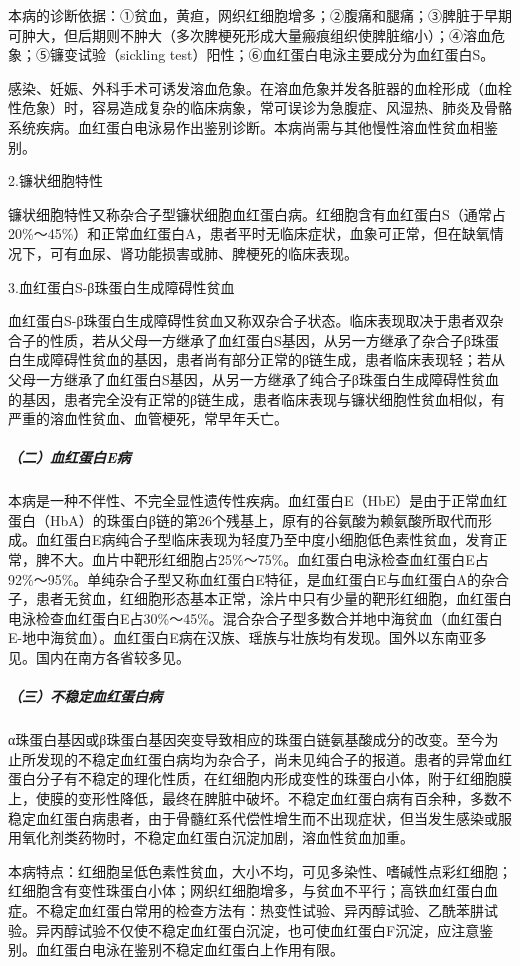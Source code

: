 本病的诊断依据：①贫血，黄疸，网织红细胞增多；②腹痛和腿痛；③脾脏于早期可肿大，但后期则不肿大（多次脾梗死形成大量瘢痕组织使脾脏缩小）；④溶血危象；⑤镰变试验（sickling
test）阳性；⑥血红蛋白电泳主要成分为血红蛋白S。

感染、妊娠、外科手术可诱发溶血危象。在溶血危象并发各脏器的血栓形成（血栓性危象）时，容易造成复杂的临床病象，常可误诊为急腹症、风湿热、肺炎及骨骼系统疾病。血红蛋白电泳易作出鉴别诊断。本病尚需与其他慢性溶血性贫血相鉴别。

2.镰状细胞特性%

镰状细胞特性又称杂合子型镰状细胞血红蛋白病。红细胞含有血红蛋白S（通常占20\%～45\%）和正常血红蛋白A，患者平时无临床症状，血象可正常，但在缺氧情况下，可有血尿、肾功能损害或肺、脾梗死的临床表现。

3.血红蛋白S-β珠蛋白生成障碍性贫血%

血红蛋白S-β珠蛋白生成障碍性贫血又称双杂合子状态。临床表现取决于患者双杂合子的性质，若从父母一方继承了血红蛋白S基因，从另一方继承了杂合子β珠蛋白生成障碍性贫血的基因，患者尚有部分正常的β链生成，患者临床表现轻；若从父母一方继承了血红蛋白S基因，从另一方继承了纯合子β珠蛋白生成障碍性贫血的基因，患者完全没有正常的β链生成，患者临床表现与镰状细胞性贫血相似，有严重的溶血性贫血、血管梗死，常早年夭亡。

\subparagraph{（二）血红蛋白E病}

本病是一种不伴性、不完全显性遗传性疾病。血红蛋白E（HbE）是由于正常血红蛋白（HbA）的珠蛋白β链的第26个残基上，原有的谷氨酸为赖氨酸所取代而形成。血红蛋白E病纯合子型临床表现为轻度乃至中度小细胞低色素性贫血，发育正常，脾不大。血片中靶形红细胞占25\%～75\%。血红蛋白电泳检查血红蛋白E占92\%～95\%。单纯杂合子型又称血红蛋白E特征，是血红蛋白E与血红蛋白A的杂合子，患者无贫血，红细胞形态基本正常，涂片中只有少量的靶形红细胞，血红蛋白电泳检查血红蛋白E占30\%～45\%。混合杂合子型多数合并地中海贫血（血红蛋白E-地中海贫血）。血红蛋白E病在汉族、瑶族与壮族均有发现。国外以东南亚多见。国内在南方各省较多见。

\subparagraph{（三）不稳定血红蛋白病}

α珠蛋白基因或β珠蛋白基因突变导致相应的珠蛋白链氨基酸成分的改变。至今为止所发现的不稳定血红蛋白病均为杂合子，尚未见纯合子的报道。患者的异常血红蛋白分子有不稳定的理化性质，在红细胞内形成变性的珠蛋白小体，附于红细胞膜上，使膜的变形性降低，最终在脾脏中破坏。不稳定血红蛋白病有百余种，多数不稳定血红蛋白病患者，由于骨髓红系代偿性增生而不出现症状，但当发生感染或服用氧化剂类药物时，不稳定血红蛋白沉淀加剧，溶血性贫血加重。

本病特点：红细胞呈低色素性贫血，大小不均，可见多染性、嗜碱性点彩红细胞；红细胞含有变性珠蛋白小体；网织红细胞增多，与贫血不平行；高铁血红蛋白血症。不稳定血红蛋白常用的检查方法有：热变性试验、异丙醇试验、乙酰苯肼试验。异丙醇试验不仅使不稳定血红蛋白沉淀，也可使血红蛋白F沉淀，应注意鉴别。血红蛋白电泳在鉴别不稳定血红蛋白上作用有限。

